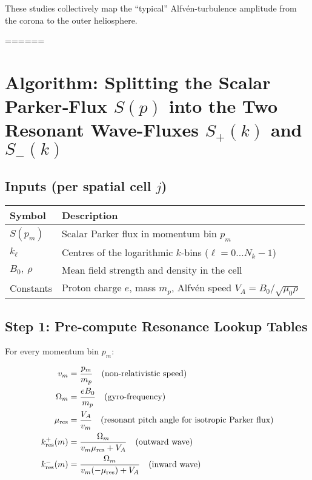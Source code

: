 These studies collectively map the “typical” Alfvén-turbulence amplitude from the corona to the outer heliosphere.



======


\section*{Algorithm: Splitting the Scalar Parker‐Flux $S(p)$ into the Two Resonant Wave-Fluxes $S_{+}(k)$ and $S_{-}(k)$}

\subsection*{Inputs (per spatial cell $j$)}

\begin{tabular}{ll}
\textbf{Symbol}       & \textbf{Description} \\
\hline
$S(p_m)$              & Scalar Parker flux in momentum bin $p_m$ \\
$k_\ell$              & Centres of the logarithmic $k$-bins ($\ell = 0 \dots N_k{-}1$) \\
$B_0,\ \rho$          & Mean field strength and density in the cell \\
Constants             & Proton charge $e$, mass $m_p$, Alfvén speed $V_A = B_0 / \sqrt{\mu_0 \rho}$ \\
\end{tabular}

\subsection*{Step 1: Pre-compute Resonance Lookup Tables}

For every momentum bin $p_m$:

\begin{align*}
v_m       &= \frac{p_m}{m_p} \quad \text{(non-relativistic speed)} \\
\Omega_m  &= \frac{e B_0}{m_p} \quad \text{(gyro-frequency)} \\
\mu_{\rm res} &= \frac{V_A}{v_m} \quad \text{(resonant pitch angle for isotropic Parker flux)} \\
k^{+}_{\rm res}(m) &= \frac{\Omega_m}{v_m \mu_{\rm res} + V_A} \quad \text{(outward wave)} \\
k^{-}_{\rm res}(m) &= \frac{\Omega_m}{v_m (-\mu_{\rm res}) + V_A} \quad \text{(inward wave)}
\end{align*}

